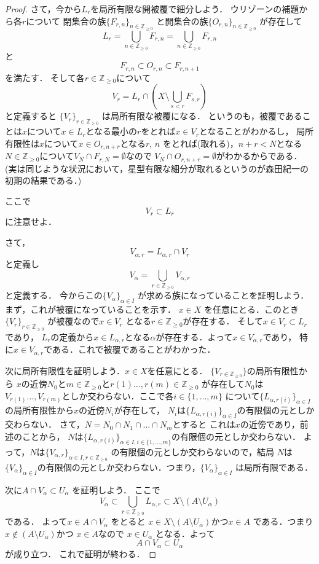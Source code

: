 \documentclass[leqno, a4paper, 12pt]{jsarticle}
\newcommand{\zz}{\mathbb{Z}}
\begin{document}
\begin{proof}
さて，今から$L_{r}$を局所有限な開被覆で細分しよう．
ウリゾーンの補題から各$r$について
閉集合の族$\{F_{r, n}\}_{n\in \zz_{\ge 0}}$
と開集合の族$\{O_{r, n}\}_{n\in \zz_{\ge 0}}$
が存在して
\[
L_{r}=\bigcup_{n\in \zz_{\ge 0}}F_{r, n}=\bigcup_{n\in \zz_{\ge 0}}F_{r, n}
\]
と
\[
F_{r, n}\subset O_{r, n}\subset F_{r, n+1}
\]
を満たす．
そして各$r\in \zz_{\ge 0}$について
\[
V_{r}=L_{r}\cap \left(X\setminus \bigcup_{s<r}F_{s, r}\right)
\]
と定義すると
$\{V_{r}\}_{r\in \zz_{\ge 0}}$
は局所有限な被覆になる．
というのも，被覆であることは$x$について$x\in L_{r}$となる最小の$r$をとれば$x\in V_{r}$となることがわかるし，
局所有限性は$x$について$x\in O_{r, n+r}$となる$r$, $n$
をとれば(取れる)，$n+r<N$となる$N\in \zz_{\ge 0}$について$V_{N}\cap F_{r, N}=\emptyset$なので
$V_{N}\cap O_{r, n+r}=\emptyset$がわかるからである．
(実は同じような状況において，星型有限な細分が取れるというのが森田紀一の初期の結果である．)


ここで
\[
V_{r}\subset L_{r}
\]
に注意せよ．

さて，
\[
V_{\alpha, r}=L_{\alpha, r}\cap V_{r}
\]
と定義し
\[
V_{\alpha}=\bigcup_{r\in \zz_{\ge 0}}V_{\alpha, r}
\]
と定義する．
今からこの$\{V_{\alpha}\}_{\alpha\in I}$
が求める族になっていることを証明しよう．
まず，これが被覆になっていることを示す．
$x\in X$
を任意にとる．このとき
$\{V_{r}\}_{r\in \zz_{\ge 0}}$
が被覆なので$x\in V_{r}$
となる$r\in \zz_{\ge 0}$が存在する．
そして$x\in V_{r}\subset L_{r}$であり，
$L_{r}$の定義から$x\in L_{\alpha, r}$となる$\alpha$が存在する．よって$x\in V_{\alpha, r}$であり，
特に$x\in V_{\alpha, r}$である．これで被覆であることがわかった．

次に局所有限性を証明しよう．$x\in X$を任意にとる．
$\{V_{r\in \zz_{\ge 0}}\}$の局所有限性から
$x$の近傍$N_{0}$と$m\in \zz_{\ge 0}$と$r(1)\dots, r(m)\in \zz_{\ge 0}$
が存在して$N_{0}$は$V_{r(1)}\dots, V_{r(m)}$としか交わらない．ここで各$i\in \{1, \dots, m\}$
について$\{L_{\alpha, r(i)}\}_{\alpha\in I}$
の局所有限性から$x$の近傍$N_{i}$が存在して，
$N_{i}$は$\{L_{\alpha, r(i)}\}_{\alpha\in I}$の有限個の元としか交わらない．
さて，$N=N_{0}\cap N_{1}\cap\dots\cap N_{m}$とすると
これは$x$の近傍であり，前述のことから，
$N$は$\{L_{\alpha, r(i)}\}_{\alpha\in I, i\in \{1, \dots, m\}}$の有限個の元としか交わらない．
よって，$N$は$\{V_{\alpha, r}\}_{\alpha\in I, r\in \zz_{\ge 0}}$
の有限個の元としか交わらないので，結局
$N$は
$\{V_{\alpha}\}_{\alpha\in I}$の有限個の元としか交わらない．つまり，$\{V_{\alpha}\}_{\alpha\in I}$
は局所有限である．

次に$A\cap V_{\alpha}\subset U_{\alpha}$
を証明しよう．
ここで
\[
V_{\alpha}\subset \bigcup_{r\in \zz_{\ge 0}}L_{\alpha, r}\subset X\setminus (A\setminus U_{\alpha})
\]
である．
よって$x\in A\cap V_{\alpha}$
をとると
$x\in X\setminus (A\setminus U_{\alpha})$かつ$x\in A$
である．つまり$x\not\in (A\setminus U_{\alpha})$かつ
$x\in A$なので
$x\in U_{\alpha}$
となる．よって
\[
A\cap V_{\alpha}\subset U_{\alpha}
\]
が成り立つ．
これで証明が終わる．
\end{proof}
\end{document}

